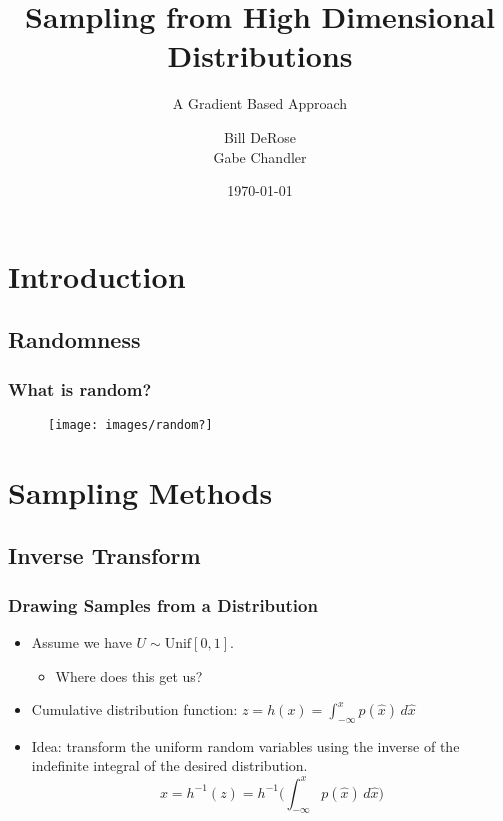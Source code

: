 \documentclass{beamer}
\title{Sampling from High Dimensional Distributions}
\subtitle{A Gradient Based Approach}
\author{Bill DeRose \\ Gabe Chandler}
\date{\today}
\begin{document}
\frame{\titlepage}

\section[Outline]{}
\frame{\tableofcontents}

\section{Introduction}
\subsection{Randomness}
\frame
{
  \frametitle{What is random?}
  \begin{figure}[!htbp]
   	\centering
   		\texttt{[image: images/random?]} 
  	 \label{fig:example}
   \end{figure}
}
\section{Sampling Methods}
\subsection{Inverse Transform}
\frame
{
  \frametitle{Drawing Samples from a Distribution}
	\begin{itemize}
		\item Assume we have $U \sim \mbox{Unif}[0, 1]$.
		\begin{itemize}
			\item Where does this get us?
		\end{itemize}
		\pause
		\item Cumulative distribution function: $z = h(x) = \int_{-\infty}^x p(\hat{x}) \,d\hat{x}$
		\pause		
		\item Idea: transform the uniform random variables using the inverse of the 
		indefinite integral of the desired distribution. 
		$$x = h^{-1}(z) = h^{-1}\bigg( \int_{-\infty}^x p(\hat{x}) \,d\hat{x}\bigg)$$
	\end{itemize}
}
\end{document}
